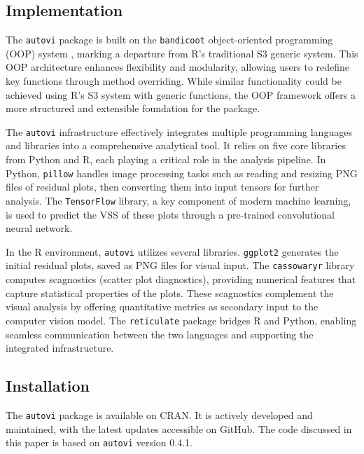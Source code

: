 \documentclass[
doublespace,
  times]{anzsauth}
\begin{document}
\subsection{Implementation}\label{sec-autovi-implementation}

The \texttt{autovi} package is built on the \texttt{bandicoot}
object-oriented programming (OOP) system \citep{bandicoot}, marking a
departure from R's traditional S3 generic system. This OOP architecture
enhances flexibility and modularity, allowing users to redefine key
functions through method overriding. While similar functionality could
be achieved using R's S3 system with generic functions, the OOP
framework offers a more structured and extensible foundation for the
package.

The \texttt{autovi} infrastructure effectively integrates multiple
programming languages and libraries into a comprehensive analytical
tool. It relies on five core libraries from Python and R, each playing a
critical role in the analysis pipeline. In Python, \texttt{pillow}
\citep{clark2015pillow} handles image processing tasks such as reading
and resizing PNG files of residual plots, then converting them into
input tensors for further analysis. The \texttt{TensorFlow}
\citep{abadi2016tensorflow} library, a key component of modern machine
learning, is used to predict the VSS of these plots through a
pre-trained convolutional neural network.

In the R environment, \texttt{autovi} utilizes several libraries.
\texttt{ggplot2} \citep{ggplot2} generates the initial residual plots,
saved as PNG files for visual input. The \texttt{cassowaryr}
\citep{mason2022cassowaryr} library computes scagnostics (scatter plot
diagnostics), providing numerical features that capture statistical
properties of the plots. These scagnostics complement the visual
analysis by offering quantitative metrics as secondary input to the
computer vision model. The \texttt{reticulate} \citep{reticulate}
package bridges R and Python, enabling seamless communication between
the two languages and supporting the integrated infrastructure.

\subsection{Installation}\label{installation}

The \texttt{autovi} package is available on CRAN. It is actively
developed and maintained, with the latest updates accessible on GitHub.
The code discussed in this paper is based on \texttt{autovi} version
0.4.1.
\end{document}
